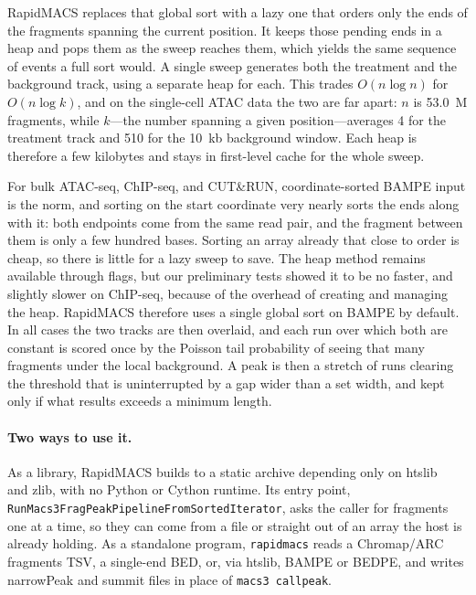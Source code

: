 \documentclass[namedate,webpdf,contemporary,large]{oup-authoring-template}
\begin{document}
RapidMACS replaces that global sort with a lazy one that orders only the ends of the fragments spanning the current position. It keeps those pending ends in a heap and pops them as the sweep reaches them, which yields the same sequence of events a full sort would. A single sweep generates both the treatment and the background track, using a separate heap for each. This trades $O(n \log n)$ for $O(n \log k)$, and on the single-cell ATAC data the two are far apart: $n$ is 53.0~M fragments, while $k$---the number spanning a given position---averages 4 for the treatment track and 510 for the 10~kb background window. Each heap is therefore a few kilobytes and stays in first-level cache for the whole sweep.

For bulk ATAC-seq, ChIP-seq, and CUT\&RUN, coordinate-sorted BAMPE input is the norm, and sorting on the start coordinate very nearly sorts the ends along with it: both endpoints come from the same read pair, and the fragment between them is only a few hundred bases. Sorting an array already that close to order is cheap, so there is little for a lazy sweep to save. The heap method remains available through flags, but our preliminary tests showed it to be no faster, and slightly slower on ChIP-seq, because of the overhead of creating and managing the heap. RapidMACS therefore uses a single global sort on BAMPE by default. In all cases the two tracks are then overlaid, and each run over which both are constant is scored once by the Poisson tail probability of seeing that many fragments under the local background. A peak is then a stretch of runs clearing the threshold that is uninterrupted by a gap wider than a set width, and kept only if what results exceeds a minimum length.

\paragraph{Two ways to use it.}
As a library, RapidMACS builds to a static archive depending only on htslib~\citep{htslib} and zlib, with no Python or Cython runtime. Its entry point, \texttt{RunMacs3\allowbreak Frag\allowbreak Peak\allowbreak Pipeline\allowbreak From\allowbreak Sorted\allowbreak Iterator}, asks the caller for fragments one at a time, so they can come from a file or straight out of an array the host is already holding. As a standalone program, \texttt{rapidmacs} reads a Chromap/ARC fragments TSV, a single-end BED, or, via htslib, BAMPE or BEDPE, and writes narrowPeak and summit files in place of \texttt{macs3 callpeak}.
\end{document}
